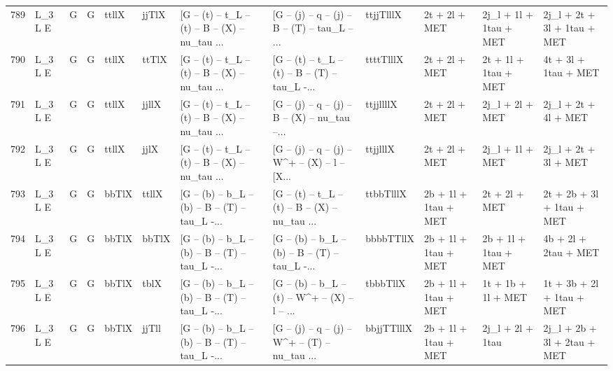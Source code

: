 \begin{tabular}{llllllllllll}
789  &      L\_3 L E &     G &     G &       ttllX &       jjTlX &  [G -- (t) -- t\_L -- (t) -- B -- (X) -- nu\_tau ... &  [G -- (j) -- q -- (j) -- B -- (T) -- tau\_L -- ... &   ttjjTlllX &            2t + 2l + MET &   2j\_l + 1l + 1tau + MET &        2j\_l + 2t + 3l + 1tau + MET \\
790  &      L\_3 L E &     G &     G &       ttllX &       ttTlX &  [G -- (t) -- t\_L -- (t) -- B -- (X) -- nu\_tau ... &  [G -- (t) -- t\_L -- (t) -- B -- (T) -- tau\_L -... &   ttttTlllX &            2t + 2l + MET &     2t + 1l + 1tau + MET &               4t + 3l + 1tau + MET \\
791  &      L\_3 L E &     G &     G &       ttllX &       jjllX &  [G -- (t) -- t\_L -- (t) -- B -- (X) -- nu\_tau ... &  [G -- (j) -- q -- (j) -- B -- (X) -- nu\_tau --... &   ttjjllllX &            2t + 2l + MET &          2j\_l + 2l + MET &               2j\_l + 2t + 4l + MET \\
792  &      L\_3 L E &     G &     G &       ttllX &        jjlX &  [G -- (t) -- t\_L -- (t) -- B -- (X) -- nu\_tau ... &  [G -- (j) -- q -- (j) -- W\textasciicircum + -- (X) -- l -- [X... &    ttjjlllX &            2t + 2l + MET &          2j\_l + 1l + MET &               2j\_l + 2t + 3l + MET \\
793  &      L\_3 L E &     G &     G &       bbTlX &       ttllX &  [G -- (b) -- b\_L -- (b) -- B -- (T) -- tau\_L -... &  [G -- (t) -- t\_L -- (t) -- B -- (X) -- nu\_tau ... &   ttbbTlllX &     2b + 1l + 1tau + MET &            2t + 2l + MET &          2t + 2b + 3l + 1tau + MET \\
794  &      L\_3 L E &     G &     G &       bbTlX &       bbTlX &  [G -- (b) -- b\_L -- (b) -- B -- (T) -- tau\_L -... &  [G -- (b) -- b\_L -- (b) -- B -- (T) -- tau\_L -... &   bbbbTTllX &     2b + 1l + 1tau + MET &     2b + 1l + 1tau + MET &               4b + 2l + 2tau + MET \\
795  &      L\_3 L E &     G &     G &       bbTlX &        tblX &  [G -- (b) -- b\_L -- (b) -- B -- (T) -- tau\_L -... &  [G -- (b) -- b\_L -- (t) -- W\textasciicircum + -- (X) -- l -- ... &    tbbbTllX &     2b + 1l + 1tau + MET &       1t + 1b + 1l + MET &          1t + 3b + 2l + 1tau + MET \\
796  &      L\_3 L E &     G &     G &       bbTlX &       jjTll &  [G -- (b) -- b\_L -- (b) -- B -- (T) -- tau\_L -... &  [G -- (j) -- q -- (j) -- W\textasciicircum + -- (T) -- nu\_tau ... &  bbjjTTlllX &     2b + 1l + 1tau + MET &         2j\_l + 2l + 1tau &        2j\_l + 2b + 3l + 2tau + MET \\

\end{tabular}
